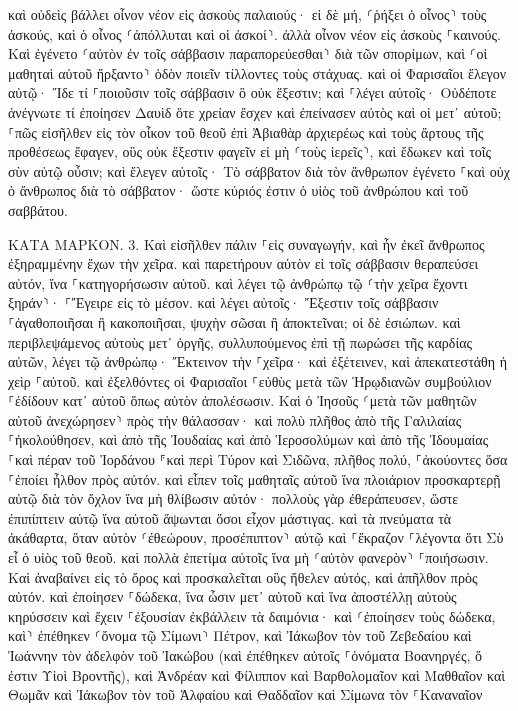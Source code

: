 \documentclass[twoside, 9pt]{extreport}
\begin{document}
καὶ οὐδεὶς βάλλει οἶνον νέον εἰς ἀσκοὺς παλαιούς· εἰ δὲ μή, ⸂ῥήξει ὁ οἶνος⸃ τοὺς ἀσκούς, καὶ ὁ οἶνος ⸂ἀπόλλυται καὶ οἱ ἀσκοί⸃. ἀλλὰ οἶνον νέον εἰς ἀσκοὺς ⸀καινούς. 
Καὶ ἐγένετο ⸂αὐτὸν ἐν τοῖς σάββασιν παραπορεύεσθαι⸃ διὰ τῶν σπορίμων, καὶ ⸂οἱ μαθηταὶ αὐτοῦ ἤρξαντο⸃ ὁδὸν ποιεῖν τίλλοντες τοὺς στάχυας. 
καὶ οἱ Φαρισαῖοι ἔλεγον αὐτῷ· Ἴδε τί ⸀ποιοῦσιν τοῖς σάββασιν ὃ οὐκ ἔξεστιν; 
καὶ ⸀λέγει αὐτοῖς· Οὐδέποτε ἀνέγνωτε τί ἐποίησεν Δαυὶδ ὅτε χρείαν ἔσχεν καὶ ἐπείνασεν αὐτὸς καὶ οἱ μετ᾽ αὐτοῦ; 
⸀πῶς εἰσῆλθεν εἰς τὸν οἶκον τοῦ θεοῦ ἐπὶ Ἀβιαθὰρ ἀρχιερέως καὶ τοὺς ἄρτους τῆς προθέσεως ἔφαγεν, οὓς οὐκ ἔξεστιν φαγεῖν εἰ μὴ ⸂τοὺς ἱερεῖς⸃, καὶ ἔδωκεν καὶ τοῖς σὺν αὐτῷ οὖσιν; 
καὶ ἔλεγεν αὐτοῖς· Τὸ σάββατον διὰ τὸν ἄνθρωπον ἐγένετο ⸀καὶ οὐχ ὁ ἄνθρωπος διὰ τὸ σάββατον· 
ὥστε κύριός ἐστιν ὁ υἱὸς τοῦ ἀνθρώπου καὶ τοῦ σαββάτου. 

ΚΑΤΑ ΜΑΡΚΟΝ.
3.
Καὶ εἰσῆλθεν πάλιν ⸀εἰς συναγωγήν, καὶ ἦν ἐκεῖ ἄνθρωπος ἐξηραμμένην ἔχων τὴν χεῖρα. 
καὶ παρετήρουν αὐτὸν εἰ τοῖς σάββασιν θεραπεύσει αὐτόν, ἵνα ⸀κατηγορήσωσιν αὐτοῦ. 
καὶ λέγει τῷ ἀνθρώπῳ τῷ ⸂τὴν χεῖρα ἔχοντι ξηράν⸃· ⸀Ἔγειρε εἰς τὸ μέσον. 
καὶ λέγει αὐτοῖς· Ἔξεστιν τοῖς σάββασιν ⸀ἀγαθοποιῆσαι ἢ κακοποιῆσαι, ψυχὴν σῶσαι ἢ ἀποκτεῖναι; οἱ δὲ ἐσιώπων. 
καὶ περιβλεψάμενος αὐτοὺς μετ᾽ ὀργῆς, συλλυπούμενος ἐπὶ τῇ πωρώσει τῆς καρδίας αὐτῶν, λέγει τῷ ἀνθρώπῳ· Ἔκτεινον τὴν ⸀χεῖρα· καὶ ἐξέτεινεν, καὶ ἀπεκατεστάθη ἡ χεὶρ ⸀αὐτοῦ. 
καὶ ἐξελθόντες οἱ Φαρισαῖοι ⸀εὐθὺς μετὰ τῶν Ἡρῳδιανῶν συμβούλιον ⸀ἐδίδουν κατ᾽ αὐτοῦ ὅπως αὐτὸν ἀπολέσωσιν. 
Καὶ ὁ Ἰησοῦς ⸂μετὰ τῶν μαθητῶν αὐτοῦ ἀνεχώρησεν⸃ πρὸς τὴν θάλασσαν· καὶ πολὺ πλῆθος ἀπὸ τῆς Γαλιλαίας ⸀ἠκολούθησεν, καὶ ἀπὸ τῆς Ἰουδαίας 
καὶ ἀπὸ Ἱεροσολύμων καὶ ἀπὸ τῆς Ἰδουμαίας ⸀καὶ πέραν τοῦ Ἰορδάνου ⸁καὶ περὶ Τύρον καὶ Σιδῶνα, πλῆθος πολύ, ⸀ἀκούοντες ὅσα ⸀ἐποίει ἦλθον πρὸς αὐτόν. 
καὶ εἶπεν τοῖς μαθηταῖς αὐτοῦ ἵνα πλοιάριον προσκαρτερῇ αὐτῷ διὰ τὸν ὄχλον ἵνα μὴ θλίβωσιν αὐτόν· 
πολλοὺς γὰρ ἐθεράπευσεν, ὥστε ἐπιπίπτειν αὐτῷ ἵνα αὐτοῦ ἅψωνται ὅσοι εἶχον μάστιγας. 
καὶ τὰ πνεύματα τὰ ἀκάθαρτα, ὅταν αὐτὸν ⸂ἐθεώρουν, προσέπιπτον⸃ αὐτῷ καὶ ⸀ἔκραζον ⸀λέγοντα ὅτι Σὺ εἶ ὁ υἱὸς τοῦ θεοῦ. 
καὶ πολλὰ ἐπετίμα αὐτοῖς ἵνα μὴ ⸂αὐτὸν φανερὸν⸃ ⸀ποιήσωσιν. 
Καὶ ἀναβαίνει εἰς τὸ ὄρος καὶ προσκαλεῖται οὓς ἤθελεν αὐτός, καὶ ἀπῆλθον πρὸς αὐτόν. 
καὶ ἐποίησεν ⸀δώδεκα, ἵνα ὦσιν μετ᾽ αὐτοῦ καὶ ἵνα ἀποστέλλῃ αὐτοὺς κηρύσσειν 
καὶ ἔχειν ⸀ἐξουσίαν ἐκβάλλειν τὰ δαιμόνια· 
καὶ ⸂ἐποίησεν τοὺς δώδεκα, καὶ⸃ ἐπέθηκεν ⸂ὄνομα τῷ Σίμωνι⸃ Πέτρον, 
καὶ Ἰάκωβον τὸν τοῦ Ζεβεδαίου καὶ Ἰωάννην τὸν ἀδελφὸν τοῦ Ἰακώβου (καὶ ἐπέθηκεν αὐτοῖς ⸀ὀνόματα Βοανηργές, ὅ ἐστιν Υἱοὶ Βροντῆς), 
καὶ Ἀνδρέαν καὶ Φίλιππον καὶ Βαρθολομαῖον καὶ Μαθθαῖον καὶ Θωμᾶν καὶ Ἰάκωβον τὸν τοῦ Ἁλφαίου καὶ Θαδδαῖον καὶ Σίμωνα τὸν ⸀Καναναῖον 
\end{document}
